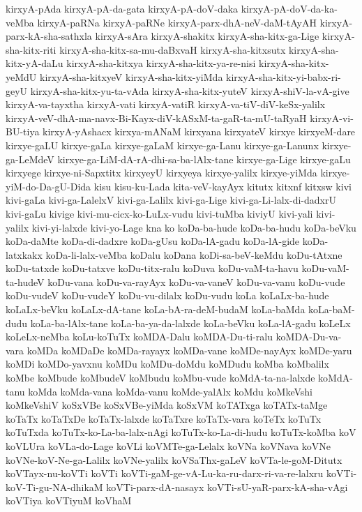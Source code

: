 {kirxyA-pAda
kirxyA-pA-da-gata
kirxyA-pA-doV-daka
kirxyA-pA-doV-da-ka-veMba
kirxyA-paRNa
kirxyA-paRNe
kirxyA-parx-dhA-neV-daM-tAyAH
kirxyA-parx-kA-sha-sathxla
kirxyA-sAra
kirxyA-shakitx
kirxyA-sha-kitx-ga-Lige
kirxyA-sha-kitx-riti
kirxyA-sha-kitx-sa-mu-daBxvaH
kirxyA-sha-kitxsutx
kirxyA-sha-kitx-yA-daLu
kirxyA-sha-kitxya
kirxyA-sha-kitx-ya-re-nisi
kirxyA-sha-kitx-yeMdU
kirxyA-sha-kitxyeV
kirxyA-sha-kitx-yiMda
kirxyA-sha-kitx-yi-babx-ri-geyU
kirxyA-sha-kitx-yu-ta-vAda
kirxyA-sha-kitx-yuteV
kirxyA-shiV-la-vA-give
kirxyA-va-tayxtha
kirxyA-vati
kirxyA-vatiR
kirxyA-va-tiV-diV-keSx-yalilx
kirxyA-veV-dhA-ma-navx-Bi-Kayx-diV-kASxM-ta-gaR-ta-mU-taRyaH
kirxyA-vi-BU-tiya
kirxyA-yAshacx
kirxya-mANaM
kirxyana
kirxyateV
kirxye
kirxyeM-dare
kirxye-gaLU
kirxye-gaLa
kirxye-gaLaM
kirxye-ga-Lanu
kirxye-ga-Lanunx
kirxye-ga-LeMdeV
kirxye-ga-LiM-dA-rA-dhi-sa-ba-lAlx-tane
kirxye-ga-Lige
kirxye-gaLu
kirxyege
kirxye-ni-Sapxtitx
kirxyeyU
kirxyeya
kirxye-yalilx
kirxye-yiMda
kirxye-yiM-do-Da-gU-Dida
kisu
kisu-ku-Lada
kita-veV-kayAyx
kitutx
kitxnf
kitxsw
kivi
kivi-gaLa
kivi-ga-LalelxV
kivi-ga-Lalilx
kivi-ga-Lige
kivi-ga-Li-lalx-di-dadxrU
kivi-gaLu
kivige
kivi-mu-cicx-ko-LuLx-vudu
kivi-tuMba
kiviyU
kivi-yali
kivi-yalilx
kivi-yi-lalxde
kivi-yo-Lage
kna
ko
koDa-ba-hude
koDa-ba-hudu
koDa-beVku
koDa-daMte
koDa-di-dadxre
koDa-gUsu
koDa-lA-gadu
koDa-lA-gide
koDa-latxkakx
koDa-li-lalx-veMba
koDalu
koDana
koDi-sa-beV-keMdu
koDu-tAtxne
koDu-tatxde
koDu-tatxve
koDu-titx-ralu
koDuva
koDu-vaM-ta-havu
koDu-vaM-ta-hudeV
koDu-vana
koDu-va-rayAyx
koDu-va-vaneV
koDu-va-vanu
koDu-vude
koDu-vudeV
koDu-vudeY
koDu-vu-dilalx
koDu-vudu
koLa
koLaLx-ba-hude
koLaLx-beVku
koLaLx-dA-tane
koLa-bA-ra-deM-budaM
koLa-baMda
koLa-baM-dudu
koLa-ba-lAlx-tane
koLa-ba-ya-da-lalxde
koLa-beVku
koLa-lA-gadu
koLeLx
koLeLx-neMba
koLu-koTuTx
koMDA-Dalu
koMDA-Du-ti-ralu
koMDA-Du-va-vara
koMDa
koMDaDe
koMDa-rayayx
koMDa-vane
koMDe-nayAyx
koMDe-yaru
koMDi
koMDo-yavxnu
koMDu
koMDu-doMdu
koMDudu
koMba
koMbalilx
koMbe
koMbude
koMbudeV
koMbudu
koMbu-vude
koMdA-ta-na-lalxde
koMdA-tanu
koMda
koMda-vana
koMda-vanu
koMde-yalAlx
koMdu
koMkeVshi
koMkeVshiV
koSxVBe
koSxVBe-yiMda
koSxVM
koTATxga
koTATx-taMge
koTaTx
koTaTxDe
koTaTx-lalxde
koTaTxre
koTaTx-vara
koTeTx
koTuTx
koTuTxda
koTuTx-ko-La-ba-lalx-nAgi
koTuTx-ko-La-di-hudu
koTuTx-koMba
koV
koVLUra
koVLa-do-Lage
koVLi
koVMTe-ga-Lelalx
koVNa
koVNava
koVNe
koVNe-koV-Ne-ga-Lalilx
koVNe-yalilx
koVSaThx-gaLeV
koVTa-le-goM-Ditutx
koVTayx-nu-koVTi
koVTi
koVTi-gaM-ge-vA-Lu-ka-ru-darx-ri-va-re-lalxru
koVTi-koV-Ti-gu-NA-dhikaM
koVTi-parx-dA-nasayx
koVTi-sU-yaR-parx-kA-sha-vAgi
koVTiya
koVTiyuM
koVhaM
}
